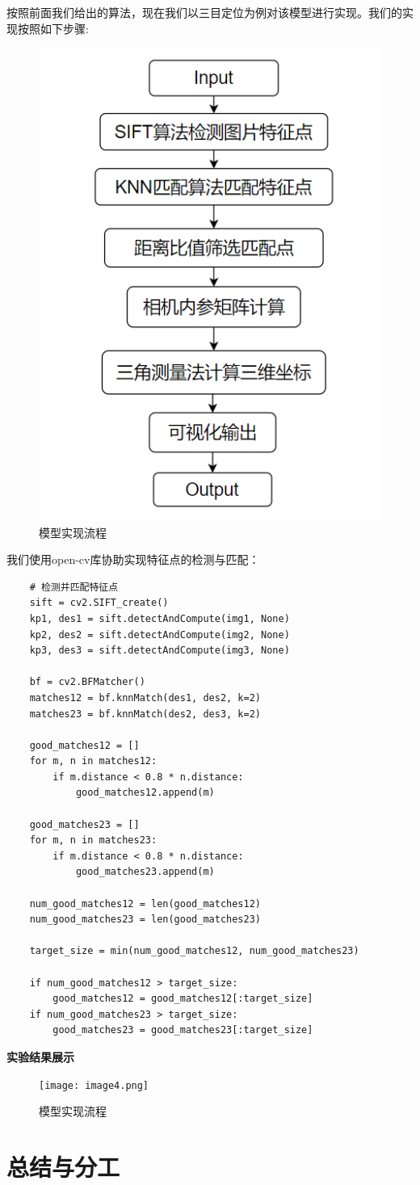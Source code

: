 \documentclass{article}
\numberwithin{equation}{section}						%
\numberwithin{figure}{section}							%
\begin{document}
\begin{sloppypar}
按照前面我们给出的算法，现在我们以三目定位为例对该模型进行实现。我们的实现按照如下步骤:

	\begin{figure}[H]
		\centering
		\includegraphics[width=0.35\linewidth]{alg-1.png}
		\caption{模型实现流程}
	\end{figure}

我们使用open-cv库协助实现特征点的检测与匹配：

\begin{lstlisting}
    # 检测并匹配特征点
    sift = cv2.SIFT_create()
    kp1, des1 = sift.detectAndCompute(img1, None)
    kp2, des2 = sift.detectAndCompute(img2, None)
    kp3, des3 = sift.detectAndCompute(img3, None)

    bf = cv2.BFMatcher()
    matches12 = bf.knnMatch(des1, des2, k=2)
    matches23 = bf.knnMatch(des2, des3, k=2)

    good_matches12 = []
    for m, n in matches12:
        if m.distance < 0.8 * n.distance:
            good_matches12.append(m)

    good_matches23 = []
    for m, n in matches23:
        if m.distance < 0.8 * n.distance:
            good_matches23.append(m)

    num_good_matches12 = len(good_matches12)
    num_good_matches23 = len(good_matches23)

    target_size = min(num_good_matches12, num_good_matches23)

    if num_good_matches12 > target_size:
        good_matches12 = good_matches12[:target_size]
    if num_good_matches23 > target_size:
        good_matches23 = good_matches23[:target_size]
\end{lstlisting}


\textbf{实验结果展示}

	\begin{figure}[H]
		\centering
		\texttt{[image: image4.png]}
		\caption{模型实现流程}
	\end{figure}

	\section{总结与分工}



	
\end{sloppypar}
\end{document}

